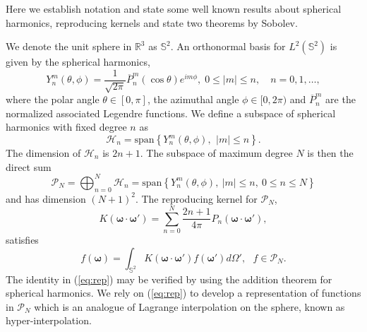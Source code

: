 \documentclass[landscape,a0b,final]{a0poster}
\newcommand{\Har}{{\mathcal H}}
\newcommand{\HH}{{\mathcal P}}
\newcommand{\bomega}{{\boldsymbol{\omega}}}
\newcommand{\odotop}{{\boldsymbol{\omega}\cdot\boldsymbol{\omega}'}}
\newenvironment{poster}{
  \begin{center}
  \begin{minipage}[c]{0.98\textwidth}
}{
  \end{minipage} 
  \end{center}
}
\begin{document}
\begin{poster}
\begin{multicols}{3}
Here we establish notation and state some well known results about
spherical harmonics, reproducing kernels and state two theorems by Sobolev.

We denote the unit sphere in $\mathbb{R}^{3}$ as $\mathbb{S}^{2}$. An orthonormal basis for $L^{2}\left(\mathbb{S}^{2}\right)$ is given by the spherical harmonics, 
\begin{equation}
Y_{n}^{m}\left(\theta,\phi\right)=\frac{1}{\sqrt{2\pi}}\overline{P}_{n}^{m}\left(\cos\theta\right)e^{im\phi},\;0\le|m|\le n,\quad n=0,1,\dots,\label{eq:ylm}
\end{equation}
where the polar angle $\theta\in[0,\pi]$, the azimuthal angle $\phi\in[0,2\pi)$
and $\overline{P}_{n}^{m}$ are the normalized associated Legendre
functions. We define a subspace of spherical harmonics with fixed degree $n$ as
\begin{equation}
\Har_{n}=\mathrm{span}\left\{ Y_{n}^{m}\left(\theta,\phi\right),\,\:|m|\le n\right\} .\label{eq:space-sp-h-fixed-degree}
\end{equation}
The dimension of $\Har_{n}$ is $2n+1$. The subspace of maximum
degree $N$ is then the direct sum
\begin{equation}
\HH_{N}=\bigoplus_{n=0}^{N}\Har_{n}=\mathrm{span}\left\{ Y_{n}^{m}\left(\theta,\phi\right),\:|m|\le n,\:0\le n\le N\right\} \label{eq:fsubsp}
\end{equation}
and has dimension $\left(N+1\right)^{2}$. The reproducing kernel for $\HH_{N}$, 
\begin{equation}
K\left(\bomega\cdot\bomega'\right) = \sum_{n=0}^{N}\frac{2n+1}{4\pi}P_{n}\left(\odotop\right),\label{eq:kernel}
\end{equation}
satisfies 
\begin{equation}
f\left(\bomega\right)=\int_{\mathbb{S}^{2}}K\left(\odotop\right)f\left(\bomega'\right)d\Omega',\,\,\,\, f\in\HH_{N}.\label{eq:rep}
\end{equation}
The identity in (\ref{eq:rep}) may be verified by using the addition theorem for spherical harmonics.
We rely on (\ref{eq:rep}) to develop a representation of functions
in $\HH_{N}$ which is an analogue of Lagrange interpolation on the sphere, known as hyper-interpolation.


\end{multicols}
\end{poster}
\end{document}

